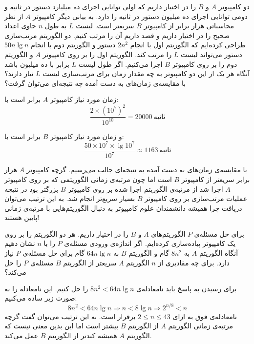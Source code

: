  دو کامپیوتر {$A$} و {$‌B$} را در اختیار داریم که اولی توانایی اجرای ده میلیارد دستور در ثانیه و دومی توانایی اجرای ده میلیون دستور در ثانیه را دارد. به بیانی دیگر کامپیوتر {$A$} از نظر محاسباتی هزار برابر از کامپیوتر {$B$} سریعتر است. لیست {$L$} به طول {$n$} حاوی اعداد صحیح را در اختیار داریم و قصد داریم  آن را مرتب‌ کنیم. دو الگوریتم مرتب‌سازی طراحی کرده‌ایم که الگوریتم اول با انجام {$2n^2$} دستور و الگوریتم دوم با انجام {$50n\lg n$} دستور می‌تواند لیست {$L$} را مرتب کند. الگوریتم اول را بر روی کامپیوتر {$A$} و الگوریتم دوم را بر روی کامپیوتر {$B$} اجرا می‌کنیم. اگر طول لیست {$L$} برابر با ده میلیون باشد آنگاه هر یک از این دو کامپیوتر به چه مقدار زمان برای مرتب‌سازی لیست {$L$} نیاز دارند؟ با مقایسه‌ی زمان‌های به دست آمده چه نتیجه‌ای می‌توان گرفت؟


زمان مورد نیاز کامپیوتر {$A$} برابر است با:
\begin{displaymath}
\frac{2\times{({10}^7)}^2}{{10}^{10}}=20000\ \text{ثانیه}
\end{displaymath}

و زمان مورد نیاز کامپیوتر {$B$} برابر است با:
\begin{displaymath}
\frac{50\times{10}^7\times\lg {10}^7}{{10}^7}\approx 1163\ \text{ثانیه}
\end{displaymath}

با مقایسه‌ی زمان‌های به دست آمده به نتیجه‌ای جالب می‌رسیم. گرچه کامپیوتر {$A$} هزار برابر سریعتر از کامپیوتر {$B$} است اما چون مرتبه‌ی زمانی الگوریتمی که بر روی کامپیوتر {$A$} اجرا شد از مرتبه‌ی الگوریتم اجرا شده بر روی کامپیوتر {$B$} بزرگتر بود در نتیجه عملیات مرتب‌سازی بر روی کامپیوتر {$B$} بسیار سریع‌تر انجام شد. به این ترتیب می‌توان دریافت چرا همیشه دانشمندان علوم کامپیوتر به دنبال الگوریتم‌هایی با مرتبه‌ی زمانی پایین هستند!

 برای حل مسئله‌ی {$P$} الگوریتم‌های {$A$} و {$B$} را در اختیار داریم. هر دو الگوریتم را بر روی یک کامپیوتر پیاده‌سازی کرده‌ایم. اگر اندازه‌ی ورودی مسئله‌ی {$P$} را با {$n$} نشان دهیم آنگاه الگوریتم {$A$} به {$8n^2$} گام و الگوریتم {$B$} به {$64n\lg n$} گام برای حل مسئله‌ی {$P$} نیاز دارد. برای چه مقادیری از {$n$} الگوریتم {$A$} سریعتر از الگوریتم {$B$} مسئله‌ی {$P$} را حل می‌کند؟


برای رسیدن به پاسخ باید نامعادله‌ی {$8n^2<64n\lg n$} را حل کنیم. این نامعادله را به صورت زیر ساده می‌کنیم:
\begin{displaymath}
8n^2 < 64n\lg n \Rightarrow n < 8\lg n \Rightarrow 2^{n/8} < n
\end{displaymath}
نامعادله‌ی فوق به ازای {$2\leq n\leq 43$} برقرار است. به این ترتیب می‌توان گفت گرچه مرتبه‌ی زمانی الگوریتم {$A$} از الگوریتم {$B$} بیشتر است اما این بدین معنی نیست که الگوریتم {$A$} همیشه کندتر از الگوریتم {$B$} عمل می‌کند.

